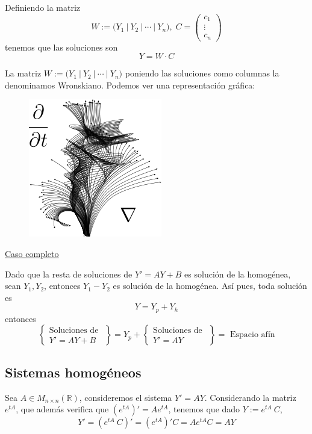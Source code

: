 Definiendo la matriz 
$$W:=\Big( Y_1 \:  | \:  Y_2 \: | \: \cdots \: | \:  Y_n \Big), \; C=\left(\begin{array}{c}
     c_1  \\
     \vdots \\
     c_n
\end{array}\right)$$
tenemos que las soluciones son 
$$\boxed{Y=W \cdot C}$$
\begin{defi}
    La matriz $W:=\Big( Y_1 \:  | \:  Y_2 \: | \: \cdots \: | \:  Y_n \Big)$ poniendo las soluciones como columnas la denominamos Wronskiano. Podemos ver una representación gráfica:
    \begin{figure}[h]
        \centering
        \includegraphics[scale=0.6]{wronskiano.png}
        \label{fig:wronskiano}
    \end{figure}

\end{defi}
\underline{Caso completo}

Dado que la resta de soluciones de $Y'=AY+B$ es solución de la homogénea, sean $Y_1, Y_2$, entonces $Y_1-Y_2$ es solución de la homogénea. Así pues, toda solución es 
$$Y=Y_p+Y_h$$
entonces 
$$\left\{\begin{array}{c}
     \text{Soluciones de }  \\
     Y'=AY+B
\end{array} \right\}=Y_p+\left\{\begin{array}{c}
     \text{Soluciones de }  \\
     Y'=AY
\end{array} \right\}=\text{ Espacio afín}$$

\subsection{Sistemas homogéneos}
Sea $A \in M_{n \times n}(\mathbb R)$, consideremos el sistema $Y'=AY$. Considerando la matriz $e^{tA}$, que además verifica que $(e^{tA})'=A e^{tA}$, tenemos que dado $Y:=e^{tA} \: C$,
$$Y'=(e^{tA} \: C)'=(e^{tA})'C=A e^{tA} C=AY$$

